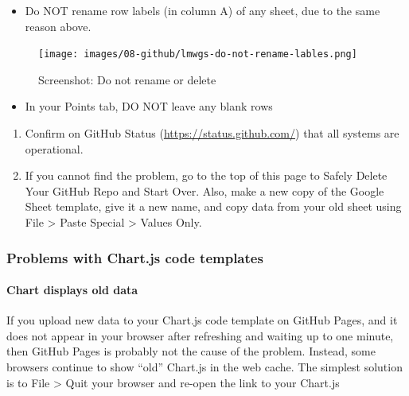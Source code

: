 \documentclass[
  english,
]{book}
\providecommand{\tightlist}{%
  \setlength{\itemsep}{0pt}\setlength{\parskip}{0pt}}
\begin{document}
\begin{itemize}
\tightlist
\item
  Do NOT rename row labels (in column A) of any sheet, due to the same reason above.
\end{itemize}

\begin{figure}
\centering
\texttt{[image: images/08-github/lmwgs-do-not-rename-lables.png]}
\caption{Screenshot: Do not rename or delete}
\end{figure}

\begin{itemize}
\tightlist
\item
  In your Points tab, DO NOT leave any blank rows
\end{itemize}

\begin{enumerate}
\def\labelenumi{\arabic{enumi})}
\setcounter{enumi}{2}
\item
  Confirm on GitHub Status (\url{https://status.github.com/}) that all systems are operational.
\item
  If you cannot find the problem, go to the top of this page to Safely Delete Your GitHub Repo and Start Over. Also, make a new copy of the Google Sheet template, give it a new name, and copy data from your old sheet using File \textgreater{} Paste Special \textgreater{} Values Only.
\end{enumerate}

\hypertarget{problems-with-chart.js-code-templates}{%
\subsubsection*{Problems with Chart.js code templates}\label{problems-with-chart.js-code-templates}}

\hypertarget{chart-displays-old-data}{%
\paragraph{Chart displays old data}\label{chart-displays-old-data}}

If you upload new data to your Chart.js code template on GitHub Pages, and it does not appear in your browser after refreshing and waiting up to one minute, then GitHub Pages is probably not the cause of the problem. Instead, some browsers continue to show ``old'' Chart.js in the web cache. The simplest solution is to File \textgreater{} Quit your browser and re-open the link to your Chart.js
\end{document}
